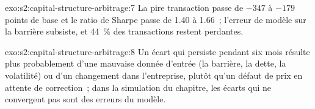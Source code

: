\begin{solution}{exo:s2:capital-structure-arbitrage:7}
La pire transaction passe de $-347$ à $-179$ points de base et le ratio de Sharpe passe de 1.40 à 1.66~; l'erreur de modèle sur la barrière subsiste, et
44~\% des transactions restent perdantes.
\end{solution}

\begin{solution}{exo:s2:capital-structure-arbitrage:8}
Un écart qui persiste pendant six mois résulte plus probablement d'une mauvaise donnée d'entrée (la barrière, la dette, la volatilité) ou d'un changement dans l'entreprise, plutôt
qu'un défaut de prix en attente de correction~; dans la simulation du chapitre, les écarts qui ne convergent pas sont des erreurs du modèle.
\end{solution}

